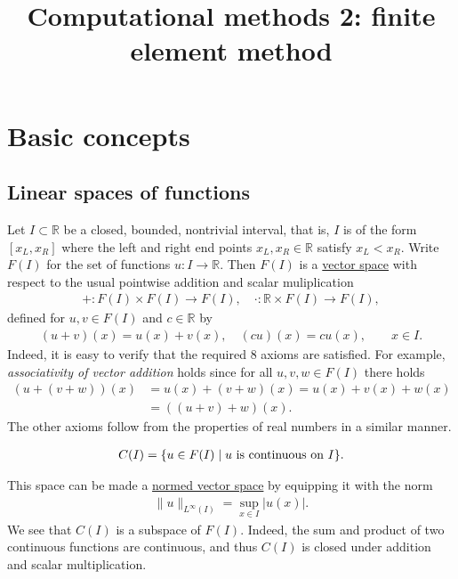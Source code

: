 \documentclass[12pt,oneside]{amsart}
\title{Computational methods 2: finite element method}
\def\R{\mathbb R}
\begin{document}
\maketitle

\tableofcontents

\section{Basic concepts}

\subsection{Linear spaces of functions}

Let $I \subset \R$ be a closed, bounded, nontrivial interval, that is, $I$ is of the form $[x_L, x_R]$
where the left and right end points $x_L, x_R \in \R$ satisfy $x_L < x_R$. Write $F(I)$ for the set of functions $u : I \to \mathbb R$. Then $F(I)$ is a 
\href{https://en.wikipedia.org/wiki/Vector_space#Notation_and_definition}{vector space} with respect to the usual pointwise addition and scalar muliplication
    \begin{align*}
+ : F(I) \times F(I) \to F(I), \quad \cdot : \mathbb R \times F(I) \to F(I),
    \end{align*}
defined for $u,v \in F(I)$ and $c \in \mathbb R$ by
    \begin{align*}
(u + v)(x) = u(x) + v(x), \quad (cu)(x) = cu(x), \qquad x \in I.
    \end{align*}
Indeed, it is easy to verify that the required 8 axioms are satisfied. For example, {\em associativity of vector addition} holds since for all $u,v,w \in F(I)$ there holds
    \begin{align*}
(u + (v + w))(x) 
&= 
u(x) + (v+w)(x) 
= 
u(x) + v(x) + w(x) 
\\&= 
((u + v) + w)(x).
    \end{align*}
The other axioms follow from the properties of real numbers in a similar manner.

\begin{definition}
    \begin{align*}
C(I) = \{ u \in F(I) \mid \textnormal{$u$ is continuous on $I$}\}.
    \end{align*}
\end{definition}

This space can be made a \href{https://en.wikipedia.org/wiki/Normed_vector_space}{normed vector space} by equipping it with the norm 
    \begin{align*}
\|u\|_{L^\infty(I)} = \sup_{x \in I} |u(x)|.
    \end{align*}
We see that $C(I)$ is a subspace of $F(I)$. Indeed, the sum and product of two continuous functions are continuous, and thus $C(I)$ is closed under addition and scalar multiplication. 
\end{document}
